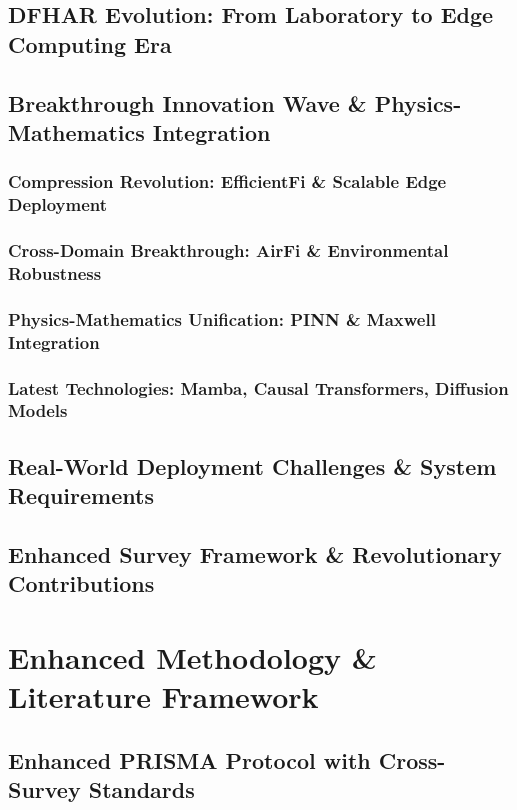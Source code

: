 \documentclass[journal]{IEEEtran}
\begin{document}
\subsection{DFHAR Evolution: From Laboratory to Edge Computing Era}

\subsection{Breakthrough Innovation Wave \& Physics-Mathematics Integration}
\subsubsection{Compression Revolution: EfficientFi \& Scalable Edge Deployment}
\subsubsection{Cross-Domain Breakthrough: AirFi \& Environmental Robustness}
\subsubsection{Physics-Mathematics Unification: PINN \& Maxwell Integration}
\subsubsection{Latest Technologies: Mamba, Causal Transformers, Diffusion Models}

\subsection{Real-World Deployment Challenges \& System Requirements}

\subsection{Enhanced Survey Framework \& Revolutionary Contributions}

\section{Enhanced Methodology \& Literature Framework}
\label{sec:methodology}

\subsection{Enhanced PRISMA Protocol with Cross-Survey Standards}
\end{document}
